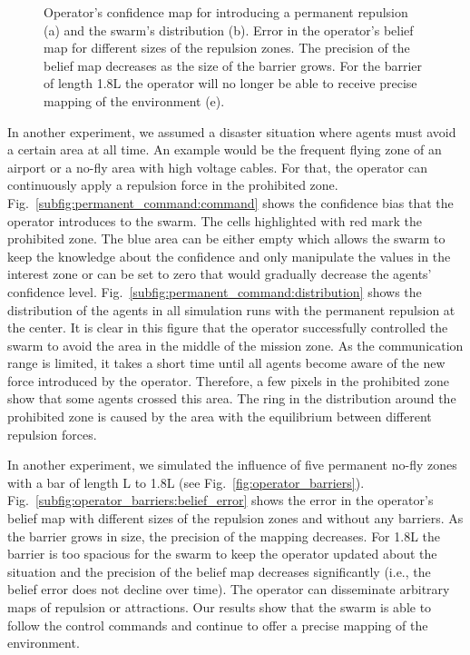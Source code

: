 \documentclass[runningheads]{llncs}%
\begin{document}
\begin{figure}
\begin{subfigure}{.09\textwidth}
        \vspace*{2em} 
    \end{subfigure}      
    \caption{Operator's confidence map for introducing a permanent repulsion (a) and the swarm's distribution (b). Error in the operator's belief map for different sizes of the repulsion zones. The precision of the belief map decreases as the size of the barrier grows. For the barrier of length 1.8L the operator will no longer be able to receive precise mapping of the environment (e).
    }
    \label{fig:permanent_command}
\end{figure}
    
In another experiment, we assumed a disaster situation where agents must avoid a certain area at all time. An example would be the frequent flying zone of an airport or a no-fly area with high voltage cables. For that, the operator can continuously apply a repulsion force in the prohibited zone.
Fig.~\ref{subfig:permanent_command:command} shows the confidence bias that the operator introduces to the swarm. The cells highlighted with red mark the prohibited zone. The blue area can be either empty which allows the swarm to keep the knowledge about the confidence and only manipulate the values in the interest zone or {can be set to zero that would gradually decrease the agents' confidence level.} Fig.~\ref{subfig:permanent_command:distribution} shows the distribution of the agents in all simulation runs with the permanent repulsion at the center. It is clear in this figure that the operator successfully controlled the swarm to avoid the area in the middle of the mission zone. As the communication range is limited, it takes a short time until all agents become aware of the new force introduced by the operator. Therefore, a few pixels in the prohibited zone show that some agents crossed this area. The ring in the distribution around the prohibited zone is caused by the area with the equilibrium between different repulsion forces.  

In another experiment, we simulated the influence of five permanent no-fly zones with a bar of length L to 1.8L (see Fig.~\ref{fig:operator_barriers}). Fig.~\ref{subfig:operator_barriers:belief_error} shows the error in the operator's belief map with different sizes of the repulsion zones and without any barriers. As the barrier grows in size, the precision of the mapping decreases. For 1.8L the barrier is too spacious for the swarm to keep the operator updated about the situation and the precision of the belief map decreases significantly (i.e., the belief error does not decline over time). The operator can disseminate arbitrary maps of repulsion or attractions. Our results show that the swarm is able to follow the control commands and continue to offer a precise mapping of the environment.
\end{document}
